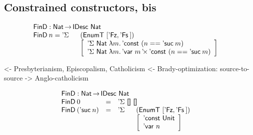 \documentclass[preprint, authoryear, onecolumn]{sigplanconf}
\newenvironment{structure}{\footnotesize\verbatim}{\endverbatim}
\begin{document}
\subsection{Constrained constructors, bis}

\[\stk{
\FinD : \Nat \To \IDesc{\Nat} \\
\begin{array}{@{}ll}
\FinD\: n = \DSigma{}{} & (\EnumT [ \FinZero , \FinSuc{} ]) \\
                        & \left[
                          \begin{array}{l}
                            \DSigma{\Nat}{\LAM{m} \DConst{(n \PropEq \NatSuc{m})}} \\
                            \DSigma{\Nat}{\LAM{m} \DProd{\DVar{m}}{\DConst{(n \PropEq \NatSuc{m})}}}
                          \end{array}
                          \right]
\end{array}
}\]

\begin{structure}
<- Presbyterianism, Episcopalism, Catholicism
<- Brady-optimization: source-to-source
    -> Anglo-catholicism
\end{structure}

\[\stk{
\FinD : \Nat \To \IDesc{\Nat} \\
\begin{array}{@{}llll}
\FinD\: 0            & = & \multicolumn{2}{l}{\DSigma{\Void}{\Void} } \\
\FinD\: (\NatSuc{n}) & = & \DSigma{}{} & (\EnumT [ \FinZero , \FinSuc{} ]) \\
                     &   &             & \left[
                                         \begin{array}{l}
                                         \DConst{\Unit} \\
                                         \DVar{n}
                                         \end{array}
                                         \right]
\end{array}
}\]

 
\end{document}
